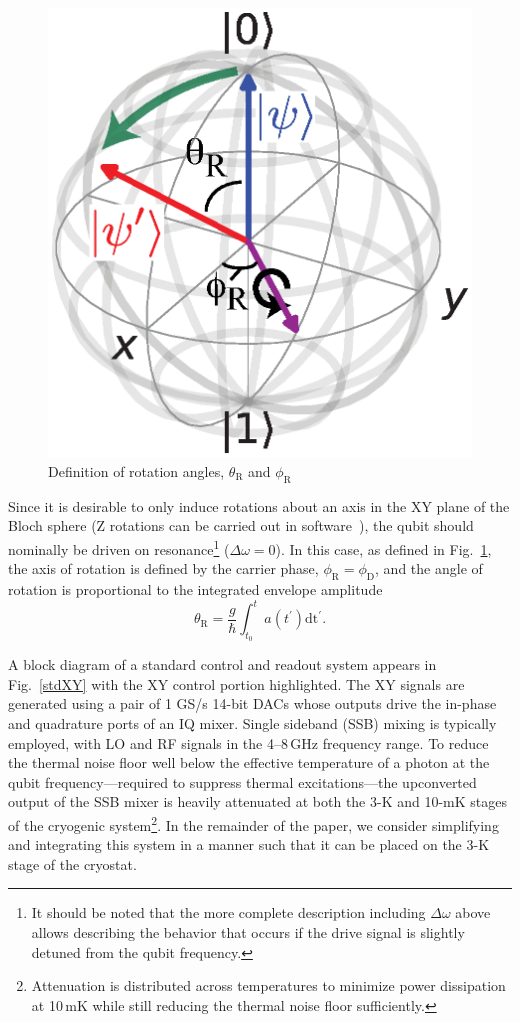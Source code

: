 \documentclass[journal]{IEEEtran}
\newcommand{\CR}[1]{{\color{black}#1}}
\begin{document}
\begin{figure}[bt!]\begin{center}
\includegraphics[width=0.6\columnwidth]{Figures/FIGURE_5}\end{center}
\caption{Definition of rotation angles, $\theta_\text{R}$ and $\phi_\text{R}$}
\label{rotatefig}
\end{figure}

Since it is desirable to only induce rotations about an axis in the XY plane of the Bloch sphere (Z rotations can be carried out in software~\cite{mckay2017efficient}), the qubit should nominally be driven on resonance\footnote{It should be noted that the more complete description including $\Delta\omega$ above allows describing the behavior that occurs if the drive signal is slightly detuned from the qubit frequency.} ($\Delta\omega=0$). In this case, as defined in Fig.~\ref{rotatefig}, the axis of rotation is defined by the carrier phase, $\phi_\text{R}=\phi_\text{D}$, and the angle of rotation is proportional to the integrated envelope amplitude
\begin{equation}
\theta_\text{R}=\frac{g}{\hbar}\int_{t_0}^ta\left(t^\prime\right)\mathrm{dt^\prime}.\label{rotate}
\end{equation}


A block diagram of a standard control and readout system appears  in Fig.~\ref{stdXY} with the XY control portion highlighted. The XY signals are generated using a pair of 1 \CR{GS}/s 14-bit DACs whose outputs drive the \CR{in-phase and quadrature} ports of an IQ mixer. Single sideband (SSB) mixing is typically employed, with LO and RF signals in the 4--8\,GHz frequency range. \CR{To reduce the thermal noise floor well below the effective temperature of a photon at the qubit frequency---required to suppress thermal excitations---}the upconverted output of the SSB mixer is heavily attenuated at both the 3-K and 10-mK stages of the cryogenic system\footnote{\CR{Attenuation is distributed across temperatures to minimize power dissipation at 10\,mK while still reducing the thermal noise floor sufficiently.}}.  In the remainder of the paper, we consider simplifying and integrating this system in a manner such that it can be placed on the 3-K stage of the cryostat.
\end{document}

